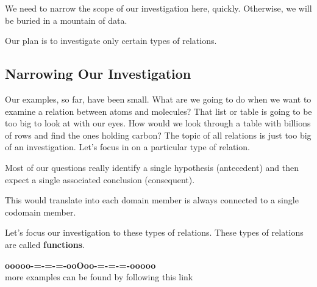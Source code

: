 \documentclass{ximera}
\begin{document}
We need to narrow the scope of our investigation here, quickly. Otherwise, we will be buried in a mountain of data.

Our plan is to investigate only certain types of relations.








\subsection*{Narrowing Our Investigation}


Our examples, so far, have been small.  What are we going to do when we want to examine a relation between atoms and molecules?  That list or table is going to be too big to look at with our eyes.  How would we look through a table with billions of rows and find the ones holding carbon?  The topic of all relations is just too big of an investigation. Let's focus in on a particular type of relation.

Most of our questions really identify a single hypothesis (antecedent) and then expect a single associated conclusion (consequent).

This would translate into each domain member is always connected to a single codomain member.

Let's focus our investigation to these types of relations.  These types of relations are called \textbf{\textcolor{purple!85!blue}{functions}}.














\begin{center}
\textbf{\textcolor{green!50!black}{ooooo-=-=-=-ooOoo-=-=-=-ooooo}} \\

more examples can be found by following this link\\ 

\end{center}
\end{document}

